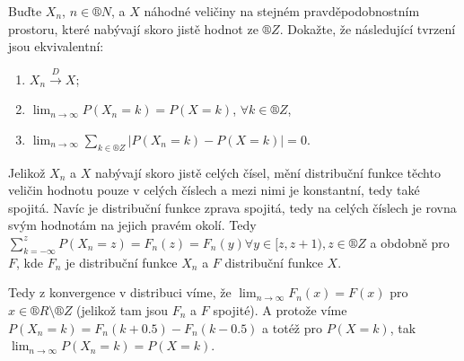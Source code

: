 \documentclass[12pt]{article}					%
\begin{document}
\begin{priklad}
\begin{reseni}
	\end{reseni}
\end{priklad}

\pagebreak
\begin{priklad}
	Buďte $X_n$, $n \in ®N$, a $X$ náhodné veličiny na stejném pravděpodobnostním prostoru, které nabývají skoro jistě hodnot ze $®Z$. Dokažte, že následující tvrzení jsou ekvivalentní:
	\vspace{-1em}

	\begin{enumerate}
		\item $X_n \overset{D} \rightarrow X$;
		\item $\lim_{n \rightarrow ∞} P(X_n = k) = P(X = k)$, $\forall k \in ®Z$,
		\item $\lim_{n \rightarrow ∞} \sum_{k \in ®Z} |P(X_n = k) - P(X = k)| = 0$.
	\end{enumerate}

	\begin{dukazin}[„1. $\implies$ 2.“]
		Jelikož $X_n$ a $X$ nabývají skoro jistě celých čísel, mění distribuční funkce těchto veličin hodnotu pouze v celých číslech a mezi nimi je konstantní, tedy také spojitá. Navíc je distribuční funkce zprava spojitá, tedy na celých číslech je rovna svým hodnotám na jejich pravém okolí. Tedy $\sum_{k = -∞}^z P(X_n = z) = F_n(z) = F_n(y) \forall y \in [z, z+1), z \in ®Z$ a obdobně pro $F$, kde $F_n$ je distribuční funkce $X_n$ a $F$ distribuční funkce $X$.

		Tedy z konvergence v distribuci víme, že $\lim_{n \rightarrow ∞} F_n(x) = F(x)$ pro $x \in ®R \setminus ®Z$ (jelikož tam jsou $F_n$ a $F$ spojité). A protože víme $P(X_n = k) = F_n(k + 0.5) - F_n(k - 0.5)$ a totéž pro $P(X = k)$, tak $\lim_{n \rightarrow ∞} P(X_n = k) = P(X = k)$.
	\end{dukazin}


\end{priklad}
\end{document}
